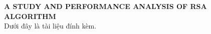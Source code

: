\documentclass[a4paper, 12pt]{article}
\begin{document}

\pagestyle{plain}



\renewcommand{\appendixname}{Phụ lục}
\renewcommand{\appendixtocname}{Phụ lục}
\renewcommand{\appendixpagename}{Phụ lục}

\newpage
\begin{appendices}
\renewcommand{\thesection}{\Alph{section}}

{\bf A STUDY AND PERFORMANCE ANALYSIS OF RSA ALGORITHM}\\
\label{appendix:a}
Dưới đây là tài liệu đính kèm.


\end{appendices}
\end{document}
